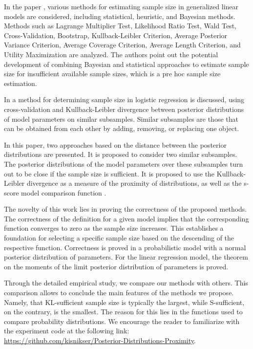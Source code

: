 \documentclass[sn-mathphys-num]{sn-jnl}%
\begin{document}
In the paper \cite{Grabovoy2022}, various methods for estimating sample size in generalized linear models are considered, including statistical, heuristic, and Bayesian methods. Methods such as Lagrange Multiplier Test, Likelihood Ratio Test, Wald Test, Cross-Validation, Bootstrap, Kullback-Leibler Criterion, Average Posterior Variance Criterion, Average Coverage Criterion, Average Length Criterion, and Utility Maximization are analyzed. The authors point out the potential development of combining Bayesian and statistical approaches to estimate sample size for insufficient available sample sizes, which is a pre hoc sample size estimation.

In \cite{MOTRENKO2014743} a method for determining sample size in logistic regression is discussed, using cross-validation and Kullback-Leibler divergence between posterior distributions of model parameters on similar subsamples. Similar subsamples are those that can be obtained from each other by adding, removing, or replacing one object.

In this paper, two approaches based on the distance between the posterior distributions are presented. It is proposed to consider two similar subsamples. The posterior distributions of the model parameters over these subsamples turn out to be close if the sample size is sufficient. It is proposed to use the Kullback-Leibler divergence \cite{MOTRENKO2014743} as a measure of the proximity of distributions, as well as the s-score model comparison function \cite{Aduenko2017}. 

The novelty of this work lies in proving the correctness of the proposed methods. The correctness of the definition for a given model implies that the corresponding function  converges to zero as the sample size increases. This establishes a foundation for selecting a specific sample size based on the descending of the respective function. Correctness is proved in a probabilistic model with a normal posterior distribution of parameters. For the linear regression model, the theorem on the moments of the limit posterior distribution of parameters is proved.

Through the detailed empirical study, we compare our methods with others. This comparison allows to conclude the main features of the methods we propose. Namely, that KL-sufficient sample size is typically the largest, while S-sufficient, on the contrary, is the smallest. The reason for this lies in the functions used to compare probability distributions. We encourage the reader to familiarize with the experiment code at the following link: 
\href{https://github.com/kisnikser/Posterior-Distributions-Proximity}{https://github.com/kisnikser/Posterior-Distributions-Proximity}.
\end{document}
